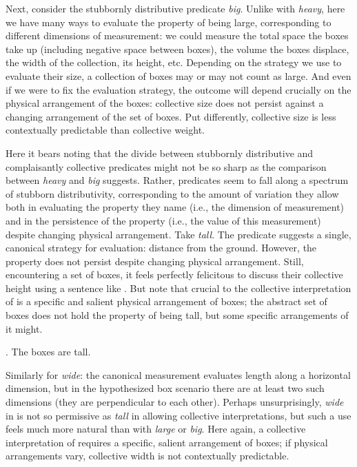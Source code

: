 \documentclass[linguex]{sp}
\begin{document}
Next, consider the stubbornly distributive predicate \emph{big}. Unlike with \emph{heavy}, here we have many ways to evaluate the property of being large, corresponding to different dimensions of measurement: we could measure the total space the boxes take up (including negative space between boxes), the volume the boxes displace, the width of the collection, its height, etc. Depending on the strategy we use to evaluate their size, a collection of boxes may or may not count as large. And even if we were to fix the evaluation strategy, the outcome will depend crucially on the physical arrangement of the boxes: collective size does not persist against a changing arrangement of the set of boxes. Put differently, collective size is less contextually predictable than collective weight.

Here it bears noting that the divide between stubbornly distributive and complaisantly collective predicates might not be so sharp as the comparison between \emph{heavy} and \emph{big} suggests. Rather, predicates seem to fall along a spectrum of stubborn distributivity, corresponding to the amount of variation they allow both in evaluating the property they name (i.e., the dimension of measurement) and in the persistence of the property (i.e., the value of this measurement) despite changing physical arrangement. Take \emph{tall}. The predicate suggests a single, canonical strategy for evaluation: distance from the ground. However, the property does not persist despite changing physical arrangement. Still, encountering a set of boxes, it feels perfectly felicitous to discuss their collective height using a sentence like \Next. But note that crucial to the collective interpretation of \Next is a specific  and salient physical arrangement of boxes; the abstract set of boxes does not hold the property of being tall, but some specific arrangements of it might.

\ex. The boxes are tall.

Similarly for \emph{wide}: the canonical measurement evaluates length along a horizontal dimension, but in the hypothesized box scenario there are at least two such dimensions (they are perpendicular to each other). Perhaps unsurprisingly, \emph{wide} in \Next is not so permissive as \emph{tall} in allowing collective interpretations, but such a use feels much more natural than with \emph{large} or \emph{big}. Here again, a collective interpretation of \Next requires a specific, salient arrangement of boxes; if physical arrangements vary, collective width is not contextually predictable.
\end{document}
